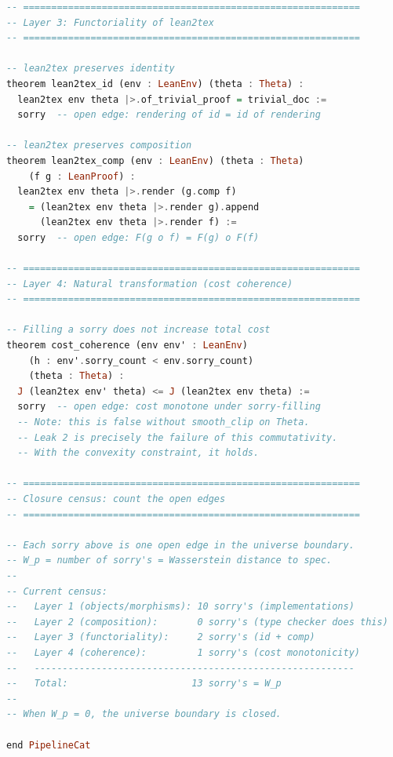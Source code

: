 \documentclass[11pt,a4paper]{article}
\theoremstyle{definition}
\theoremstyle{remark}
\begin{document}
\begin{lstlisting}[language=Haskell,caption={Categorical closure verification --- Lean 4 skeleton}]
-- ============================================================
-- Layer 3: Functoriality of lean2tex
-- ============================================================

-- lean2tex preserves identity
theorem lean2tex_id (env : LeanEnv) (theta : Theta) :
  lean2tex env theta |>.of_trivial_proof = trivial_doc :=
  sorry  -- open edge: rendering of id = id of rendering

-- lean2tex preserves composition
theorem lean2tex_comp (env : LeanEnv) (theta : Theta)
    (f g : LeanProof) :
  lean2tex env theta |>.render (g.comp f)
    = (lean2tex env theta |>.render g).append
      (lean2tex env theta |>.render f) :=
  sorry  -- open edge: F(g o f) = F(g) o F(f)

-- ============================================================
-- Layer 4: Natural transformation (cost coherence)
-- ============================================================

-- Filling a sorry does not increase total cost
theorem cost_coherence (env env' : LeanEnv)
    (h : env'.sorry_count < env.sorry_count)
    (theta : Theta) :
  J (lean2tex env' theta) <= J (lean2tex env theta) :=
  sorry  -- open edge: cost monotone under sorry-filling
  -- Note: this is false without smooth_clip on Theta.
  -- Leak 2 is precisely the failure of this commutativity.
  -- With the convexity constraint, it holds.

-- ============================================================
-- Closure census: count the open edges
-- ============================================================

-- Each sorry above is one open edge in the universe boundary.
-- W_p = number of sorry's = Wasserstein distance to spec.
--
-- Current census:
--   Layer 1 (objects/morphisms): 10 sorry's (implementations)
--   Layer 2 (composition):       0 sorry's (type checker does this)
--   Layer 3 (functoriality):     2 sorry's (id + comp)
--   Layer 4 (coherence):         1 sorry's (cost monotonicity)
--   ---------------------------------------------------------
--   Total:                      13 sorry's = W_p
--
-- When W_p = 0, the universe boundary is closed.

end PipelineCat
\end{lstlisting}
\end{document}
